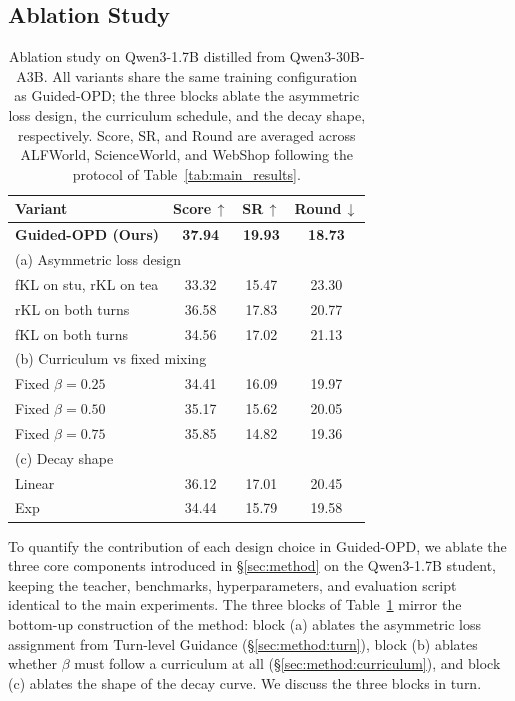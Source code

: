 \documentclass[11pt]{article}
\begin{document}
\subsection{Ablation Study}
\label{sec:exp:ablation}

\begin{table}[t]
\centering
\small
\setlength{\tabcolsep}{4pt}
\renewcommand{\arraystretch}{1.05}
\caption{Ablation study on Qwen3-1.7B distilled from Qwen3-30B-A3B. All variants share the same training configuration as Guided-OPD; the three blocks ablate the asymmetric loss design, the curriculum schedule, and the decay shape, respectively. Score, SR, and Round are averaged across ALFWorld, ScienceWorld, and WebShop following the protocol of Table~\ref{tab:main_results}.}
\label{tab:ablation}
\begin{tabular}{lccc}
\toprule
\textbf{Variant} & Score\,$\uparrow$ & SR\,$\uparrow$ & Round\,$\downarrow$ \\
\midrule
\textbf{Guided-OPD (Ours)} & \textbf{37.94} & \textbf{19.93} & \textbf{18.73} \\
\midrule
\multicolumn{4}{l}{(a) Asymmetric loss design} \\
\quad fKL on stu, rKL on tea & 33.32 & 15.47 & 23.30 \\
\quad rKL on both turns      & 36.58 & 17.83 & 20.77 \\
\quad fKL on both turns      & 34.56 & 17.02 & 21.13 \\
\midrule
\multicolumn{4}{l}{(b) Curriculum vs fixed mixing} \\
\quad Fixed $\beta = 0.25$   & 34.41 & 16.09 & 19.97 \\
\quad Fixed $\beta = 0.50$   & 35.17 & 15.62 & 20.05 \\
\quad Fixed $\beta = 0.75$   & 35.85 & 14.82 & 19.36 \\
\midrule
\multicolumn{4}{l}{(c) Decay shape} \\
\quad Linear                 & 36.12 & 17.01 & 20.45 \\
\quad Exp                    & 34.44 & 15.79 & 19.58 \\
\bottomrule
\end{tabular}
\end{table}

To quantify the contribution of each design choice in Guided-OPD, we ablate the three core components introduced in \S\ref{sec:method} on the Qwen3-1.7B student, keeping the teacher, benchmarks, hyperparameters, and evaluation script identical to the main experiments. The three blocks of Table~\ref{tab:ablation} mirror the bottom-up construction of the method: block (a) ablates the asymmetric loss assignment from Turn-level Guidance (\S\ref{sec:method:turn}), block (b) ablates whether $\beta$ must follow a curriculum at all (\S\ref{sec:method:curriculum}), and block (c) ablates the shape of the decay curve. We discuss the three blocks in turn.
\end{document}
